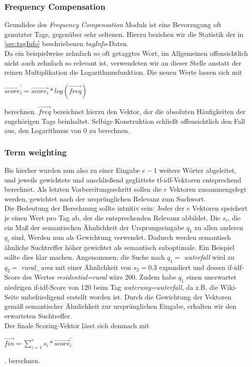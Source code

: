 \documentclass[12pt,pdftex,a4paper]{article}
\begin{document}
\subsubsection{Frequency Compensation}
Grundidee des \textit{Frequency Compensation} Moduls ist eine Bevorzugung oft genutzter Tags, gegenüber sehr seltenen. Hierzu beziehen wir die Statistik der in \autoref{sec:tagInfo} beschriebenen \textit{tagInfo}-Daten. \\
Da ein beispielweise zehnfach so oft getaggtes Wort, im Allgemeinen offensichtlich nicht auch zehnfach so relevant ist, verwendeten wir an dieser Stelle anstatt der reinen Multiplikation die Logarithmusfunktion. Die neuen Werte lassen sich mit 
\begin{center}
	 $\vec{score}_{i}^{'} = \vec{score_i} * log(\vec{freq})$
\end{center}
berechnen. $\vec{freq}$ bezeichnet hierzu den Vektor, der die absoluten Häufigkeiten der zugehörigen Tags beinhaltet. Selbige Konstruktion schließt offensichtlich den Fall aus, den Logarithmus von 0 zu berechnen.

\subsubsection{Term weighting}\label{sec:term_weighting}
Bis hierher wurden nun also zu einer Eingabe $e-1$ weitere Wörter abgeleitet, und jeweils gewichtete und anschließend geglättete tf-idf-Vektoren entsprechend berechnet. Als letzten Vorbereitungsschritt sollen die $e$ Vektoren zusammengelegt werden, gewichtet nach der ursprünglichen Relevanz zum Suchwort.\\
Die Bedeutung der Berechnung sollte intuitiv sein: Jeder der $e$ Vektoren speichert je einen Wert pro Tag ab, der die entsprechenden Relevanz abbildet. Die $s_i$, die ein Maß der semantischen Ähnlichkeit der Ursprungseingabe $q_1$ zu allen anderen $q_i$ sind, Werden nun als Gewichtung verwendet. Dadurch werden semantisch ähnliche Suchtreffer höher gewichtet als semantisch suboptimale. Ein Beispiel sollte dies klar machen. Angenommen, die Suche nach $q_1 =$ \textit{waterfall} wird zu $q_2 =$ \textit{rural\_area} mit einer Ähnlichkeit von  $s_2 = 0.3$ expandiert und dessen if-idf-Score des Wertes \textit{residential=rural} wäre 200. Zudem habe $q_1 $ einen unerwartet niedrigen if-idf-Score von 120 beim Tag \textit{waterway=waterfall}, da z.B. die Wiki-Seite unbefriedigend erstellt worden ist. Durch die Gewichtung der Vektoren gemäß semantischer Ähnlichkeit zur ursprünglichen Eingabe, erhalten wir den erwarteten Suchtreffer.\\
Der finale Scoring-Vektor lässt sich demnach mit\\
\begin{center}
	$\vec{fin} = \sum_{i=1}^{e} s_i * \vec{score}_{i}^{'}$
\end{center}.
berechnen.
\end{document}
